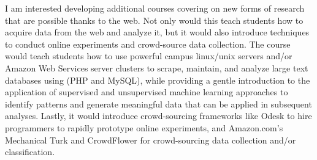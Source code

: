 \documentclass[12pt]{article}
\begin{document}

I am interested developing additional courses covering on new forms of research that are possible thanks to the web.  Not only would this teach students how to acquire data from the web and analyze it, but it would also introduce techniques to conduct online experiments and crowd-source data collection.  The course would teach students how to use powerful campus linux/unix servers and/or Amazon Web Services server clusters to scrape, maintain, and analyze large text databases using (PHP and MySQL), while providing a gentle introduction to the application of supervised and unsupervised machine learning approaches to identify patterns and generate meaningful data that can be applied in subsequent analyses.  Lastly, it would introduce crowd-sourcing frameworks like Odesk to hire programmers to rapidly prototype online experiments, and Amazon.com's Mechanical Turk and CrowdFlower for crowd-sourcing data collection and/or classification.   
\end{document}
